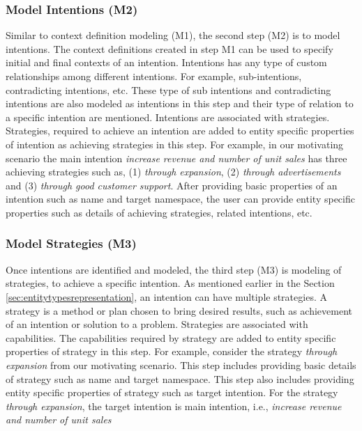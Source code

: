 \subsubsection{Model Intentions (M2)}  
Similar to context definition modeling (M1), the second step (M2) is to model intentions. The context definitions created in step M1 can be used to specify initial and final contexts of an intention. Intentions has any type of custom relationships among different intentions. For example, sub-intentions, contradicting intentions, etc. These type of sub intentions and contradicting intentions are also modeled as intentions in this step and their type of relation to a specific intention are mentioned. Intentions are associated with strategies. Strategies, required to achieve an intention are added to entity specific properties of intention as achieving strategies in this step. For example, in our motivating scenario the main intention \textit{increase revenue and number of unit sales} has three achieving strategies such as, (1) \textit{through expansion}, (2) \textit{through advertisements} and (3) \textit{through good customer support}. After providing basic properties of an intention such as name and target namespace, the user can provide entity specific properties such as details of achieving strategies, related intentions, etc.

\subsubsection{Model Strategies (M3)}  
Once intentions are identified and modeled, the third step (M3) is modeling of strategies, to achieve a specific intention. As mentioned earlier in the Section \ref{sec:entitytypesrepresentation}, an intention can have multiple strategies.  A strategy is a method or plan chosen to bring desired results, such as achievement of an intention or solution to a problem. Strategies are associated with capabilities. The capabilities required by strategy are added to entity specific properties of strategy in this step. For example, consider the strategy \textit{through expansion} from our motivating scenario. This step includes providing basic details of strategy such as name and target namespace. This step also includes providing entity specific properties of strategy such as target intention. For the strategy \textit{through expansion}, the target intention is main intention, i.e., \textit{increase revenue and number of unit sales}  

